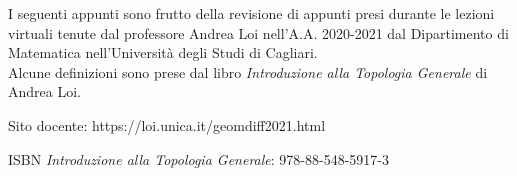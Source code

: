 I seguenti appunti sono frutto della revisione di appunti presi durante le lezioni virtuali tenute dal professore Andrea Loi nell'A.A. 2020-2021 dal Dipartimento di Matematica nell'Università degli Studi di Cagliari. \\
Alcune definizioni sono prese dal libro \textit{Introduzione alla Topologia Generale} di Andrea Loi.

Sito docente: https://loi.unica.it/geomdiff2021.html

ISBN \textit{Introduzione alla Topologia Generale}: 978-88-548-5917-3
